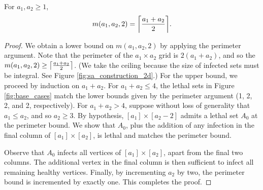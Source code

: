 \begin{thm}
\label{thm:perimeter_rects}
For $a_1, a_2 \geq 1$,
$$m(a_1,a_2,2) = \ceil*{\frac{a_1+a_2}{2}}.$$
\end{thm}

\begin{proof}
We obtain a lower bound on $m(a_1,a_2,2)$ by applying the perimeter argument. Note that the perimeter of the $a_1 \times a_2$ grid is $2(a_1+a_2)$, and so the $m(a_1,a_2,2) \geq \ceil*{\frac{a_1+a_2}{2}}$. (We take the ceiling because the size of infected sets must be integral. See Figure \ref{fig:sa_construction_2d}.) For the upper bound, we proceed by induction on $a_1+a_2$. For $a_1+a_2 \leq 4$, the lethal sets in Figure \ref{fig:base_cases} match the lower bounds given by the perimeter argument (1, 2, 2, and 2, respectively). For $a_1+a_2 > 4$, suppose without loss of generality that $a_1 \leq a_2$, and so $a_2 \geq 3$. By hypothesis, $[a_1] \times [a_2-2]$ admits a lethal set $A_0$ at the perimeter bound. We show that $A_0$, plus the addition of any infection in the final column of $[a_1] \times [a_2]$, is lethal and matches the perimeter bound. 

Observe that $A_0$ infects all vertices of $[a_1] \times [a_2]$, apart from the final two columns. The additional vertex in the final column is then sufficient to infect all remaining healthy vertices. Finally, by incrementing $a_2$ by two, the perimeter bound is incremented by exactly one. This completes the proof.
\end{proof}

